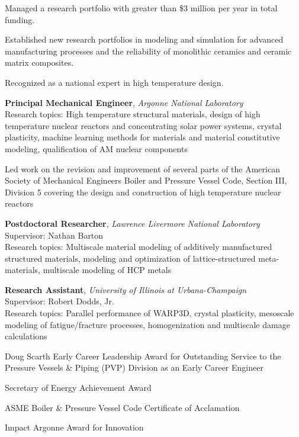 Managed a research portfolio with greater than \$3 million per year in total funding.  

Established new research portfolios in modeling and simulation for advanced manufacturing processes and the reliability of monolithic ceramics and ceramic matrix composites.

Recognized as a national expert in high temperature design.

\textbf{Principal Mechanical Engineer}, \emph{Argonne National Laboratory}
\\
Research topics: High temperature structural materials, design
of high temperature nuclear reactors and concentrating solar power systems,
crystal plasticity, machine learning
methods for materials and material constitutive modeling,
qualification of AM nuclear components

Led work on the revision and improvement of several parts of the American Society of 
Mechanical Engineers Boiler and Pressure Vessel Code, Section III, Division 5 covering the
design and construction of high temperature nuclear reactors

\textbf{Postdoctoral Researcher}, \emph{Lawrence Livermore National
Laboratory} \\
Supervisor: Nathan Barton \\
Research topics: Multiscale material modeling of additively manufactured
structured materials, modeling and optimization of lattice-structured
meta-materials, multiscale modeling of HCP metals

\textbf{Research Assistant}, \emph{University of Illinois at Urbana-Champaign}
\\
Supervisor: Robert Dodds, Jr. \\
Research topics: Parallel performance of WARP3D, crystal plasticity,
mesoscale modeling of fatigue/fracture processes, homogenization and
multiscale damage calculations


Doug Scarth Early Career Leadership Award for Outstanding Service to the Pressure Vessels \& Piping (PVP) Division as an Early Career Engineer 

Secretary of Energy Achievement Award 

ASME Boiler \& Pressure Vessel Code Certificate of Acclamation 

Impact Argonne Award for Innovation 

